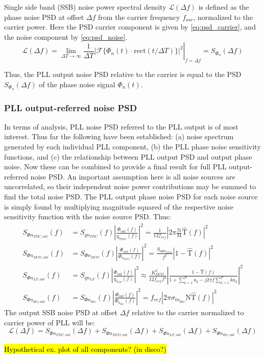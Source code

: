 		 Single side band (SSB) noise power spectral density $\mathcal{L}(\Delta f)$ is defined as the phase noise PSD at offset $\Delta f$ from the carrier frequency $f_{osc}$, normalized to the carrier power. Here the PSD carrier component is given by \ref{eq:psd_carrier}, and the noise component by \ref{eq:psd_noise}.
		\begin{equation}
			\mathcal{L}(\Delta f) = \left.\lim_{\Delta T\rightarrow\infty}\frac{1}{\Delta T}|\mathcal{F}\{\Phi_{n}(t)\cdot\mathrm{rect}(t/\Delta T)\}|^2 \right|_{f=\Delta f}= S_{\Phi_{n}}(\Delta f)
		\end{equation}

		Thus, the PLL output noise PSD relative to the carrier is equal to the PSD $S_{\Phi_{n}}(\Delta f)$ of the phase noise signal $\Phi_{n}(t)$.

	\subsubsection{PLL output-referred noise PSD}
	In terms of analysis, PLL noise PSD referred to the PLL output is of most interest. Thus far the following have been established: (a) noise spectrum generated by each individual PLL component, (b) the PLL phase noise sensitivity functions, and (c) the relationship between PLL output PSD and output phase noise. Now these can be combined to provide a final result for full PLL output-referred noise PSD. An important assumption here is all noise sources are uncorrelated, so their independent noise power contributions may be summed to find the total noise PSD. The PLL output phase noise PSD for each noise source is simply found by multiplying magnitude squared of the respective noise sensitivity function with the noise source PSD. Thus:
	\begin{align}
		S_{\Phi n_{TDC,out}}(f) &= S_{qn_{TDC}}(f)\left|\frac{\Phi_{out}(f)}{q_{n_{TDC}}(f)}\right|^2 = \frac{1}{12f_{ref}}\left|2\pi\frac{\mathrm{N}}{\mathrm{M}}\hat{\mathrm{T}}(f)\right|^2\\
		S_{\Phi n_{DCO,out}}(f) &= S_{\Phi n_{DCO}}(f)\left|\frac{\Phi_{out}(f)}{\Phi_{n_{DCO}}(f)}\right|^2  = \frac{S_{0\Phi n_{DCO}}}{f^2}\left|1-\hat{\mathrm{T}}(f)\right|^2\\		
		S_{\Phi n_{LF,out}}(f) &= S_{q n_{LF}}(f)\left|\frac{\Phi_{out}(f)}{q_{n_{LF}}(f)}\right|^2 \approx \frac{K_{DCO}^2}{12f_{ref}f^2}\left|\frac{1-\hat{\mathrm{T}}(f)}{1+\sum_{k=1}^P a_k - j2\pi f\sum_{k=1}^P ka_k}\right|^2\\
		S_{\Phi n_{div,out}}(f) &= S_{\Phi n_{div}}(f)\left|\frac{\Phi_{out}(f)}{\Phi_{n_{div}}(f)}\right|^2 = f_{ref}\left|2\pi\sigma_{tn_{div}}\mathrm{N}\hat{\mathrm{T}}(f)\right|^2
	\end{align}
	The output SSB noise PSD at offset $\Delta f$ relative to the carrier normalized to carrier power of PLL will be:
	\begin{equation}
		\mathcal{L}(\Delta f) = S_{\Phi n_{TDC,out}}(\Delta f) + S_{\Phi n_{DCO,out}}(\Delta f) + S_{\Phi n_{LF,out}}(\Delta f) + S_{\Phi n_{div,out}}(\Delta f)
	\end{equation}



	\hl{Hypothetical ex. plot of all components? (in disco?)}



